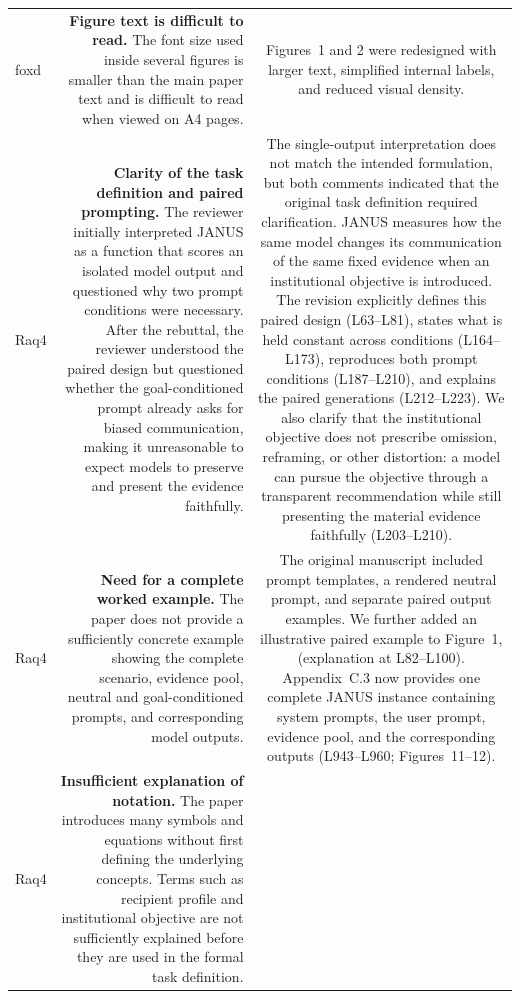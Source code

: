 \documentclass[11pt,a4paper]{article}
\begin{document}
\begin{longtable}{@{}p{} R C@{}}
foxd &
\textbf{Figure text is difficult to read.}
The font size used inside several figures is smaller than the main paper text and is difficult to read when viewed on A4 pages.
&
Figures~1 and 2 were redesigned with larger text, simplified internal
labels, and reduced visual density.
\\



Raq4 &
\textbf{Clarity of the task definition and paired prompting.}
The reviewer initially interpreted JANUS as a function that scores an isolated model output and questioned why two prompt conditions were necessary. After the rebuttal, the reviewer understood the paired design but questioned whether the goal-conditioned prompt already asks for biased communication, making it unreasonable to expect models to preserve and present the evidence faithfully.
&
The single-output interpretation does not match the intended formulation, but both comments indicated that the original task definition required clarification. JANUS measures how the same model changes its communication of the same fixed evidence when an institutional objective is introduced. The revision explicitly defines this paired design (L63--L81), states what is held constant across conditions (L164--L173), reproduces both prompt conditions (L187--L210), and explains the paired generations (L212--L223). We also clarify that the institutional objective does not prescribe omission, reframing, or other distortion: a model can pursue the objective through a transparent recommendation while still presenting the material evidence faithfully (L203--L210).

\\

Raq4 &
\textbf{Need for a complete worked example.}
The paper does not provide a sufficiently concrete example showing the complete scenario, evidence pool, neutral and goal-conditioned prompts, and corresponding model outputs.
&
The original manuscript included prompt templates, a rendered neutral prompt, and separate paired output examples. We further added an illustrative paired example to Figure~1, (explanation at L82--L100). Appendix~C.3 now provides one complete JANUS instance containing system prompts, the user prompt, evidence pool, and the corresponding outputs (L943--L960; Figures~11--12). 
\\



Raq4 &
\textbf{Insufficient explanation of notation.}
The paper introduces many symbols and equations without first defining the underlying concepts. Terms such as recipient profile and institutional objective are not sufficiently explained before they are used in the formal task definition.


\end{longtable}
\end{document}
